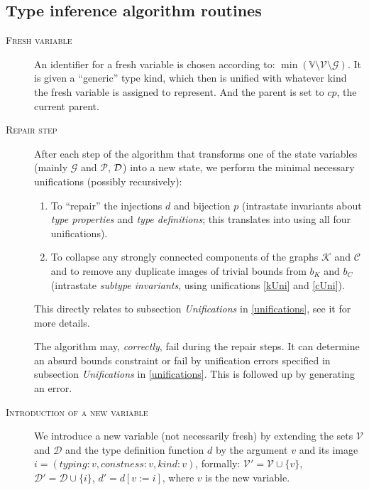 \subsection{Type inference algorithm routines}

\begin{description}
    \item[\textsc{Fresh variable}] An identifier for a fresh variable is chosen according to: \linebreak $\min \left(\mathbb{V} \setminus \mathcal{V} \setminus \mathcal{G}\right)$. It is given a ``generic'' type kind, which then is unified with whatever kind the fresh variable is assigned to represent. And the parent is set to $cp$, the current parent.

    \item[\textsc{Repair step}] After each step of the algorithm that transforms one of the state variables (mainly $\mathcal{G}$ and $\mathcal{P}$, $\mathcal{D}$) into a new state, we perform the minimal necessary unifications (possibly recursively):

    \begin{enumerate}
        \item To ``repair'' the injections $d$ and bijection $p$ (intrastate invariants about \emph{type properties} and \emph{type definitions}; this translates into using all four unifications).

        \item To collapse any strongly connected components of the graphs $\mathcal{K}$ and  $\mathcal{C}$ and to remove any duplicate images of trivial bounds from $b_K$ and $b_C$ (intrastate \emph{subtype invariants}, using unifications \ref{kUni} and \ref{cUni}).
    \end{enumerate}

    This directly relates to subsection \emph{Unifications} in \cref{unifications}, see it for more details.

    The algorithm may, \emph{correctly}, fail during the repair steps. It can determine an absurd bounds constraint or fail by unification errors specified in subsection \emph{Unifications} in \cref{unifications}. This is followed up by generating an error.

    \item[\textsc{Introduction of a new variable}] We introduce a new variable (not necessarily fresh) by extending the sets $\mathcal{V}$ and $\mathcal{D}$ and the type definition function $d$ by the argument $v$ and its image $i = (typing: v, constness: v, kind: v)$, formally: $\mathcal{V}' = \mathcal{V} \cup \{v\}$, $\mathcal{D}' = \mathcal{D} \cup \{i\}$, $d' = d [v := i]$, where $v$ is the new variable.


\end{description}
